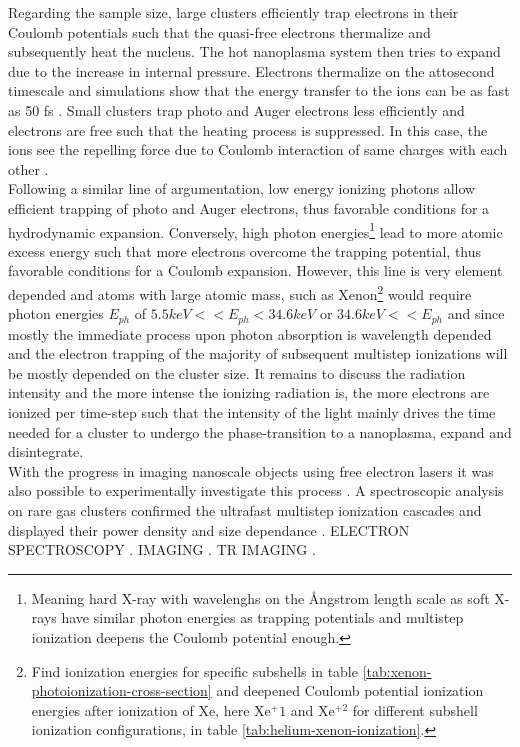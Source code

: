 Regarding the sample size, large clusters efficiently trap electrons in their Coulomb potentials such that the quasi-free electrons thermalize and subsequently heat the nucleus. The hot nanoplasma system then tries to expand due to the increase in internal pressure. Electrons thermalize on the attosecond timescale and simulations show that the energy transfer to the ions can be as fast as 50 fs \citep{TBD}. Small clusters trap photo and Auger electrons less efficiently and electrons are free such that the heating process is suppressed. In this case, the ions see the repelling force due to Coulomb interaction of same charges with each other \citep{TBD}.\\
Following a similar line of argumentation, low energy ionizing photons allow efficient trapping of photo and Auger electrons, thus favorable conditions for a hydrodynamic expansion. Conversely, high photon energies\footnote{Meaning hard X-ray with wavelenghs on the {\AA}ngstrom length scale as soft X-rays have similar photon energies as trapping potentials and multistep ionization deepens the Coulomb potential enough.} lead to more atomic excess energy such that more electrons overcome the trapping potential, thus favorable conditions for a Coulomb expansion. However, this line is very element depended and atoms with large atomic mass, such as Xenon\footnote{Find ionization energies for specific subshells in table \ref{tab:xenon-photoionization-cross-section} and deepened Coulomb potential ionization energies after ionization of Xe, here Xe$^+1$ and Xe$^{+2}$ for different subshell ionization configurations, in table \ref{tab:helium-xenon-ionization}.} would require photon energies $E_{ph}$ of $5.5keV<< E_{ph}<34.6k eV$ or $34.6keV<<E_{ph}$ and since mostly the immediate process upon photon absorption is wavelength depended and the electron trapping of the majority of subsequent multistep ionizations will be mostly depended on the cluster size. It remains to discuss the radiation intensity and the more intense the ionizing radiation is, the more electrons are ionized per time-step such that the intensity of the light mainly drives the time needed for a cluster to undergo the phase-transition to a nanoplasma, expand and disintegrate.\\
With the progress in imaging nanoscale objects using free electron lasers it was also possible to experimentally investigate this process \citep{Bostedt-2010-JPB}. A spectroscopic analysis on rare gas clusters confirmed the ultrafast multistep ionization cascades and displayed their power density and size dependance \citep{Wabnitz-2002-Nature,Laarmann-2004-PRL,Bostedt-2008-PRL}. ELECTRON SPECTROSCOPY \citep{Laarmann-2005-PRL,Bostedt-2010-NJP}. IMAGING \citep{Bostedt-2012-PRL,Gorkhover-2012-PRL}. TR IMAGING \citep{Ferguson-2016-SciAdv,Gorkhover-2016-NatPho}.
